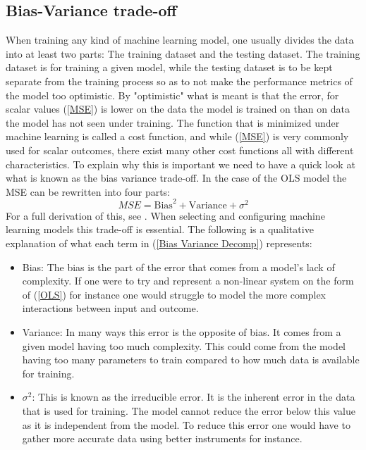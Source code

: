 \subsection{Bias-Variance trade-off}
\label{Bias-Variance trade-off}
When training any kind of machine learning model, one usually divides the data 
into at least two parts: The training dataset and the testing dataset. The training 
dataset is for training a given model, while the testing dataset is to be kept separate 
from the training process so as to not make the performance metrics of the model too optimistic. 
By "optimistic" what is meant is that the error, for scalar values (\ref{MSE}) is 
lower on the data the model is trained on than on data the model has not seen under 
training. The function that is minimized under machine learning is called a 
cost function, and while (\ref{MSE}) is very commonly used for scalar outcomes, 
there exist many other cost functions all with different characteristics. 
To explain 
why this is important we need to have a quick look at what is known as the 
bias variance trade-off.
In the case of the OLS model the MSE can be rewritten into four parts:
\begin{equation}
    MSE = \text{Bias}^2 + \text{Variance} + \sigma^2
    \label{Bias Variance Decomp}
\end{equation}
For a full derivation of this, see \citet{vijayakumar2007bias}. When selecting and 
configuring machine learning models this trade-off is essential. The following is 
a qualitative explanation of what each term in (\ref{Bias Variance Decomp})
represents:
\begin{itemize}
\item Bias: The bias is the part of the error that comes from a model's lack of complexity.  If one were to try and represent a non-linear system on the form of (\ref{OLS}) for instance one would struggle to model the more complex interactions between input and outcome.
\item Variance: In many ways this error is the opposite of bias. It comes from a given model having too much complexity. This could come from the model having too many parameters to train compared to how much data is available for training. 
\item $\sigma^2$: This is known as the irreducible error. It is the inherent error in the data that is used for training. The model cannot reduce the error below this value as it is independent from the model. To reduce this error one would have to gather more accurate data using better instruments for instance. 
\end{itemize}
